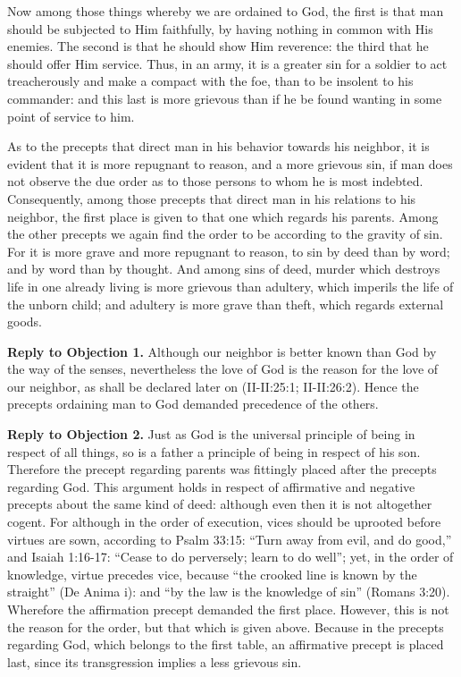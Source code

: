 Now among those things whereby we are ordained to God, the first is that man should be subjected to Him faithfully, by having nothing in common with His enemies. The second is that he should show Him reverence: the third that he should offer Him service. Thus, in an army, it is a greater sin for a soldier to act treacherously and make a compact with the foe, than to be insolent to his commander: and this last is more grievous than if he be found wanting in some point of service to him.

As to the precepts that direct man in his behavior towards his neighbor, it is evident that it is more repugnant to reason, and a more grievous sin, if man does not observe the due order as to those persons to whom he is most indebted. Consequently, among those precepts that direct man in his relations to his neighbor, the first place is given to that one which regards his parents. Among the other precepts we again find the order to be according to the gravity of sin. For it is more grave and more repugnant to reason, to sin by deed than by word; and by word than by thought. And among sins of deed, murder which destroys life in one already living is more grievous than adultery, which imperils the life of the unborn child; and adultery is more grave than theft, which regards external goods.

\textbf{Reply to Objection 1.} Although our neighbor is better known than God by the way of the senses, nevertheless the love of God is the reason for the love of our neighbor, as shall be declared later on (II-II:25:1; II-II:26:2). Hence the precepts ordaining man to God demanded precedence of the others.

\textbf{Reply to Objection 2.} Just as God is the universal principle of being in respect of all things, so is a father a principle of being in respect of his son. Therefore the precept regarding parents was fittingly placed after the precepts regarding God. This argument holds in respect of affirmative and negative precepts about the same kind of deed: although even then it is not altogether cogent. For although in the order of execution, vices should be uprooted before virtues are sown, according to Psalm 33:15: ``Turn away from evil, and do good,'' and Isaiah 1:16-17: ``Cease to do perversely; learn to do well''; yet, in the order of knowledge, virtue precedes vice, because ``the crooked line is known by the straight'' (De Anima i): and ``by the law is the knowledge of sin'' (Romans 3:20). Wherefore the affirmation precept demanded the first place. However, this is not the reason for the order, but that which is given above. Because in the precepts regarding God, which belongs to the first table, an affirmative precept is placed last, since its transgression implies a less grievous sin.

